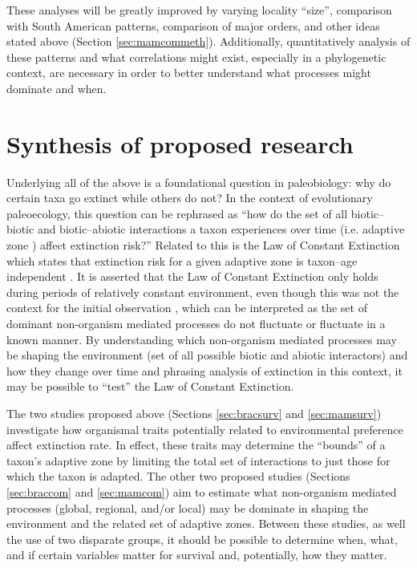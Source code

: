 \documentclass[12pt,letterpaper]{article}
\begin{document}
These analyses will be greatly improved by varying locality ``size'', comparison with South American patterns, comparison of major orders, and other ideas stated above (Section \ref{sec:mamcommeth}). Additionally, quantitatively analysis of these patterns and what correlations might exist, especially in a phylogenetic context, are necessary in order to better understand what processes might dominate and when.

\clearpage

\section{Synthesis of proposed research} \label{sec:synth}
Underlying all of the above is a foundational question in paleobiology: why do certain taxa go extinct while others do not? In the context of evolutionary paleoecology, this question can be rephrased as ``how do the set of all biotic--biotic and biotic--abiotic interactions a taxon experiences over time (i.e. adaptive zone \citealp{Simpson1944}) affect extinction risk?'' Related to this is the Law of Constant Extinction which states that extinction risk for a given adaptive zone is taxon--age independent \citep{VanValen1973}. It is asserted that the Law of Constant Extinction only holds during periods of relatively constant environment, even though this was not the context for the initial observation \citep{Liow2007b,VanValen1973}, which can be interpreted as the set of dominant non-organism mediated processes do not fluctuate or fluctuate in a known manner. By understanding which non-organism mediated processes may be shaping the environment (set of all possible biotic and abiotic interactors) and how they change over time and phrasing analysis of extinction in this context, it may be possible to ``test'' the Law of Constant Extinction.

The two studies proposed above (Sections \ref{sec:bracsurv} and \ref{sec:mamsurv}) investigate how organismal traits potentially related to environmental preference affect extinction rate. In effect, these traits may determine the ``bounds'' of a taxon's adaptive zone by limiting the total set of interactions to just those for which the taxon is adapted. The other two proposed studies (Sections \ref{sec:braccom} and \ref{sec:mamcom}) aim to estimate what non-organism mediated processes (global, regional, and/or local) may be dominate in shaping the environment and the related set of adaptive zones. Between these studies, as well the use of two disparate groups, it should be possible to determine when, what, and if certain variables matter for survival and, potentially, how they matter. 
\end{document}
